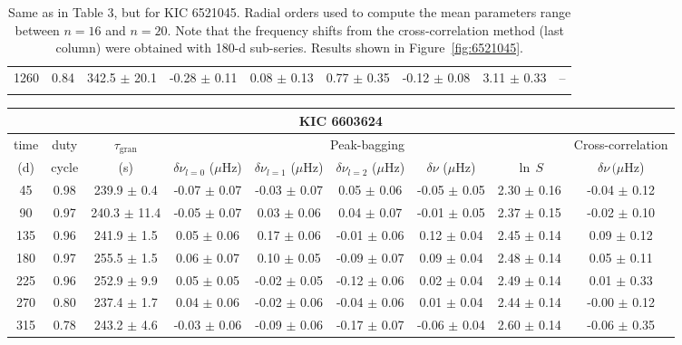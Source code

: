\documentclass[twocolumn]{aastex61}%
\begin{document}
\begin{table*}[ht]
\begin{tabular}{ccc|ccccc|c}
1260 & 0.84 & 342.5 $\pm$ 20.1 & -0.28 $\pm$ 0.11 & 0.08 $\pm$ 0.13 & 0.77 $\pm$ 0.35 & -0.12 $\pm$ 0.08 & 3.11 $\pm$ 0.33 & --\\\vspace{-0.3cm}
\end{tabular}
\caption{Same as in Table 3, but for KIC 6521045. {Radial orders used to compute the mean parameters range between $n=16$ and $n=20$.} Note that the frequency shifts from the cross-correlation method (last column) were obtained with 180-d sub-series. Results shown in Figure~\ref{fig:6521045}.}\label{tab:6521045}\vspace{-2cm}
\end{table*}

\begin{table*}[ht]\centering\fontsize{9.}{7.}\selectfont
\begin{tabular}{ccc|ccccc|c}
\multicolumn{9}{c}{KIC 6603624}\\ \hline\hline
time & duty & $\tau_\text{gran}$ &\multicolumn{5}{c|}{Peak-bagging}&Cross-correlation\\
(d)& cycle & (s)&$\delta\nu_{l=0}$ ($\mu$Hz) & $\delta\nu_{l=1}$ ($\mu$Hz) & $\delta\nu_{l=2}$ ($\mu$Hz) & $\delta\nu$ ($\mu$Hz)& $\ln\,S$ & $\delta\nu\,(\mu$Hz)\\\hline
45 & 0.98 & 239.9 $\pm$ 0.4 & -0.07 $\pm$ 0.07 & -0.03 $\pm$ 0.07 & 0.05 $\pm$ 0.06 & -0.05 $\pm$ 0.05 & 2.30 $\pm$ 0.16 & -0.04 $\pm$ 0.12\\
90 & 0.97 & 240.3 $\pm$ 11.4 & -0.05 $\pm$ 0.07 & 0.03 $\pm$ 0.06 & 0.04 $\pm$ 0.07 & -0.01 $\pm$ 0.05 & 2.37 $\pm$ 0.15 & -0.02 $\pm$ 0.10\\
135 & 0.96 & 241.9 $\pm$ 1.5 & 0.05 $\pm$ 0.06 & 0.17 $\pm$ 0.06 & -0.01 $\pm$ 0.06 & 0.12 $\pm$ 0.04 & 2.45 $\pm$ 0.14 & 0.09 $\pm$ 0.12\\
180 & 0.97 & 255.5 $\pm$ 1.5 & 0.06 $\pm$ 0.07 & 0.10 $\pm$ 0.05 & -0.09 $\pm$ 0.07 & 0.09 $\pm$ 0.04 & 2.48 $\pm$ 0.14 & 0.05 $\pm$ 0.11\\
225 & 0.96 & 252.9 $\pm$ 9.9 & 0.05 $\pm$ 0.05 & -0.02 $\pm$ 0.05 & -0.12 $\pm$ 0.06 & 0.02 $\pm$ 0.04 & 2.49 $\pm$ 0.14 & 0.01 $\pm$ 0.33\\
270 & 0.80 & 237.4 $\pm$ 1.7 & 0.04 $\pm$ 0.06 & -0.02 $\pm$ 0.06 & -0.04 $\pm$ 0.06 & 0.01 $\pm$ 0.04 & 2.44 $\pm$ 0.14 & -0.00 $\pm$ 0.12\\
315 & 0.78 & 243.2 $\pm$ 4.6 & -0.03 $\pm$ 0.06 & -0.09 $\pm$ 0.06 & -0.17 $\pm$ 0.07 & -0.06 $\pm$ 0.04 & 2.60 $\pm$ 0.14 & -0.06 $\pm$ 0.35\\

\end{tabular}
\end{table*}
\end{document}
